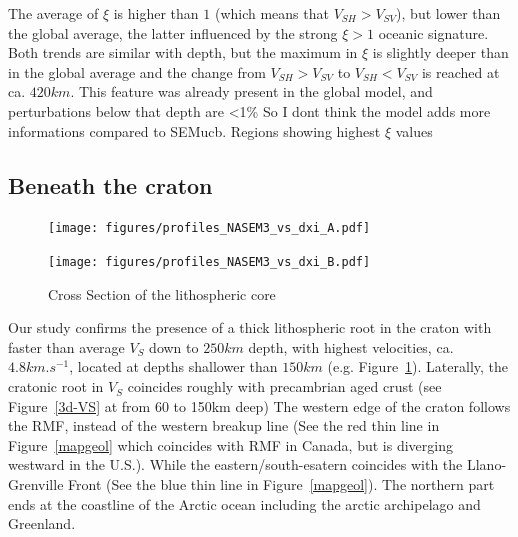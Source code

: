 \documentclass[12pt]{article}
\begin{document}

The average of $\xi$ is higher than $1$ (which means that $V_{SH} > V_{SV}$), but lower than the global average, the latter influenced by the strong $\xi > 1$ oceanic signature.
Both trends are similar with depth, but the maximum in $\xi$ is slightly deeper than in the global average and the change from $V_{SH} > V_{SV}$ to $V_{SH} < V_{SV}$ is reached at ca. $420km$. {\color{red} This feature was already present in the global model, and perturbations below that depth are <1\% So I dont think the model adds more informations compared to SEMucb}.
Regions showing highest $\xi$ values 

\subsection{Beneath the craton}

\begin{figure}
	\begin{minipage}{0.5\linewidth}
		\centerline{\texttt{[image: figures/profiles\_NASEM3\_vs\_dxi\_A.pdf]}}
	\end{minipage}
	\hfill
	\begin{minipage}{0.5\linewidth}
		\centerline{\texttt{[image: figures/profiles\_NASEM3\_vs\_dxi\_B.pdf]}}
	\end{minipage}

	\caption{Cross Section of the lithospheric core}
	\label{cratoncross}

\end{figure}


Our study confirms the presence of a thick lithospheric root in the craton with faster than average $V_S$ down to $250km$ depth, with highest velocities, ca. $4.8km.s^{-1}$, located at depths shallower than  $150km$ (e.g. Figure~\ref{cratoncross}). 
Laterally, the cratonic root in $V_S$ coincides roughly with precambrian aged crust (see Figure~\ref{3d-VS} at from 60 to 150km deep)
The western edge of the craton follows the RMF, instead of the western breakup line (See the red thin line in Figure~\ref{mapgeol} which coincides with RMF in Canada, but is diverging westward in the U.S.). While the eastern/south-esatern coincides with the Llano-Grenville Front (See the blue thin line in Figure~\ref{mapgeol}). 
The northern part ends at the coastline of the Arctic ocean including the arctic archipelago and Greenland. 
\end{document}
